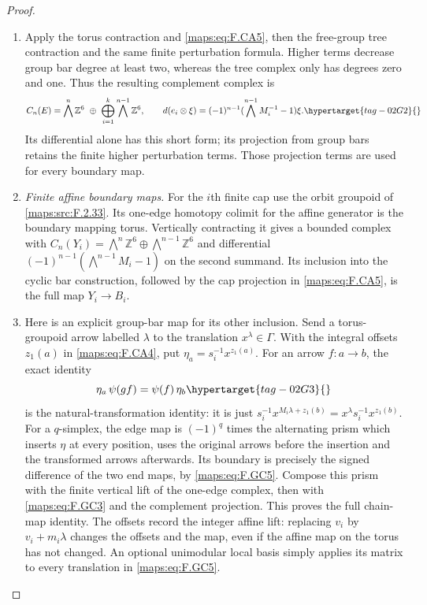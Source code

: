 \documentclass[11pt,a4paper]{article}
\numberwithin{equation}{section}
\theoremstyle{definition}
\begin{document}
\begin{proof}
\begin{enumerate}[label=\arabic*.]
\item Apply the torus contraction and \eqref{maps:eq:F.CA5}, then the free-group
tree contraction and the same finite perturbation formula.
Higher terms decrease group bar degree at least two, whereas
the tree complex only has degrees zero and one.  Thus the
resulting complement complex is
\begin{equation}
 C_n(E)=\bigwedge^n\mathbb Z^6\ \oplus\
 \bigoplus_{i=1}^k\bigwedge^{n-1}\mathbb Z^6,
 \qquad
 d(e_i\otimes\xi)=(-1)^{n-1}
   (\bigwedge^{n-1}M_i^{-1}-1)\xi.                         \hypertarget{tag-02G2}{}\label{maps:eq:F.GC4}
\end{equation}
Its differential alone has this short form; its projection
from group bars retains the finite higher perturbation terms.
Those projection terms are used for every boundary map.

\item \emph{Finite affine boundary maps.}
For the $i$th finite cap use the orbit groupoid of \ref{maps:src:F.2.33}.
Its one-edge homotopy colimit for the affine generator is
the boundary mapping torus.  Vertically contracting it gives
a bounded complex with
$C_n(Y_i)=\bigwedge^n\mathbb Z^6\oplus
\bigwedge^{n-1}\mathbb Z^6$ and differential
$(-1)^{n-1}(\bigwedge^{n-1}M_i-1)$ on the second summand.
Its inclusion into the cyclic bar construction, followed by
the cap projection in \eqref{maps:eq:F.CA5}, is the full map $Y_i\to B_i$.


\item Here is an explicit group-bar map for its other inclusion.
Send a torus-groupoid arrow labelled $\lambda$ to the
translation $x^\lambda\in\Gamma$.  With the integral offsets
$z_1(a)$ in \eqref{maps:eq:F.CA4}, put
$\eta_a=s_i^{-1}x^{z_1(a)}$.
For an arrow $f:a\to b$, the exact identity
\begin{equation}
 \eta_a\,\psi(gf)=\psi(f)\,\eta_b                        \hypertarget{tag-02G3}{}\label{maps:eq:F.GC5}
\end{equation}
is the natural-transformation identity: it is just
$s_i^{-1}x^{M_i\lambda+z_1(b)}
 =x^\lambda s_i^{-1}x^{z_1(b)}$.
For a $q$-simplex, the edge map is $(-1)^q$ times the
alternating prism which inserts $\eta$ at every position,
uses the original arrows before the insertion and the
transformed arrows afterwards.  Its boundary is precisely
the signed difference of the two end maps, by \eqref{maps:eq:F.GC5}.
Compose this prism with the finite vertical lift of the
one-edge complex, then with \eqref{maps:eq:F.GC3} and the complement
projection.  This proves the full chain-map identity.
The offsets record the integer affine lift: replacing
$v_i$ by $v_i+m_i\lambda$ changes the offsets and the map,
even if the affine map on the torus has not changed.
An optional unimodular local basis simply applies its matrix
to every translation in \eqref{maps:eq:F.GC5}.


\end{enumerate}
\end{proof}
\end{document}
